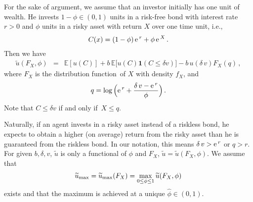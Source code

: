 \documentclass[11pt,a4]{amsart}
\newcommand{\blue}{\color{darkblue}}
\newcommand{\ex}{{\rm e}\,}
\newcommand{\df}{distribution function}
\newcommand{\beao}{\begin{eqnarray*}}
\newcommand{\eeao}{\end{eqnarray*}\noindent}
\newcommand{\beam}{\begin{eqnarray}}
\newcommand{\eeam}{\end{eqnarray}\noindent}
\newcommand{\wt}{\widetilde}
\newcommand{\fif}{if and only if}
\newcommand{\E }{{\mathbb E}}
\newcommand{\1}{{\mathbf 1}}
\begin{document}
For the sake of argument, we assume that an investor initially has one
unit of wealth. He invests $1-\phi\in (0,1)$ units in a risk-free 
bond with interest rate $r>0$ and $\phi$ units in a risky asset with
return $X$ over one time unit, i.e.,
\beam\label{eq:xxie1}
  C(x) = (1 - \phi)\, \ex^{r} + \phi \,\ex^{X}\,.
\eeam
Then we have 
\beao
\wt u(F_X, \phi) &=& \E [u(C)] + b\, \E \big[u(C)\1(C \le  \delta v)\big] - b \,u(\delta\, v) F_X(q)\,,
\eeao
where $F_X$ is the \df\ of $X$ with density $f_X$, and
\beao
  q = %
\log\Big(
    \ex^r + {\delta \,v - \ex^r \over \phi}
  \Big)\,.
\eeao
Note that $C \le \delta v$ \fif\ $X \le  q$. 
\par
Naturally, if an agent invests in
a risky asset instead of a riskless bond, he expects to obtain a
higher (on average) return from the risky asset than he is guaranteed from the
riskless bond. In our notation, this means $\delta \,v > \ex^r$ or
$q > r $. For given $b,\delta,v$, $\wt u$ is only a functional of $\phi$ and $F_X$,
$\wt u=\wt u (F_X, \phi)$.
We assume that
\beao
\wt u_{\rm max}=\wt u_{\rm max}(F_X) = \max_{0 \le  \phi \leq 1} \wt u (F_X,\phi)
\eeao
exists and that the maximum is achieved at a unique $\hat\phi \in (0, 1)$.
\end{document}
